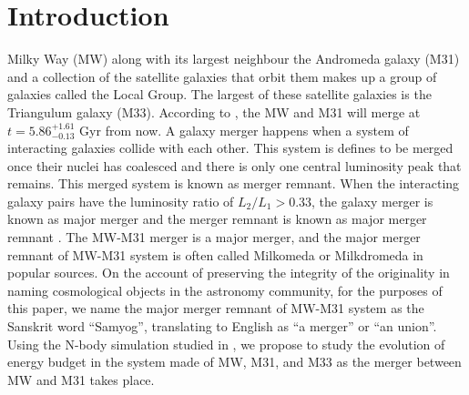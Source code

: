 \documentclass[twocolumn]{aastex631}
\begin{document}

\author[0000-0001-7379-2625]{Jay Motka} 
\date{\today}



\vspace{-1cm}

\section{Introduction}
\label{sec:intro}

Milky Way (MW) along with its largest neighbour the Andromeda galaxy (M31) and a collection of the satellite galaxies that orbit them makes up a group of galaxies called the Local Group. The largest of these satellite galaxies is the Triangulum galaxy (M33). According to \cite{simulation}, the MW and M31 will merge at $t = 5.86^{+1.61}_{-0.13}$ Gyr from now. A galaxy merger happens when a system of interacting galaxies collide with each other. This system is defines to be merged once their nuclei has coalesced and there is only one central luminosity peak that remains. This merged system is known as merger remnant. When the interacting galaxy pairs have the luminosity ratio of $L_2/L_1 > 0.33$, the galaxy merger is known as major merger and the merger remnant is known as major merger remnant \citep{major_merger_def}. The MW-M31 merger is a major merger, and the major merger remnant of MW-M31 system is often called Milkomeda or Milkdromeda in popular sources. On the account of preserving the integrity of the originality in naming cosmological objects in the astronomy community, for the purposes of this paper, we name the major merger remnant of MW-M31 system as the Sanskrit word ``Samyog'', translating to English as ``a merger'' or ``an union''. Using the N-body simulation studied in \cite{simulation}, we propose to study the evolution of energy budget in the system made of MW, M31, and M33 as the merger between MW and M31 takes place. 
\end{document}

